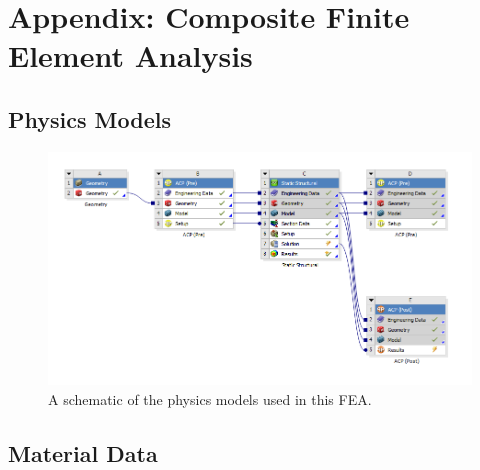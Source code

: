 \section{Appendix: Composite Finite Element Analysis}

\subsection{Physics Models}

\begin{figure}[htp]
\centering
\includegraphics[width=1\textwidth]{./figures/fea/fea-project-schematic}
\caption{A schematic of the physics models used in this FEA.}
\label{fig:fea-project-schematic}
\end{figure}

\clearpage

\subsection{Material Data}

